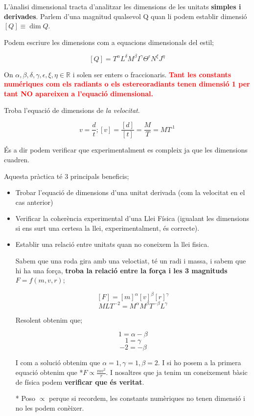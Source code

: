 \documentclass[12pt]{article}
\newcommand{\R}{\mathbb{R}}
\begin{document}
L'ànalisi dimensional tracta d'analitzar les dimensions de les unitats \textbf{simples i derivades}. Parlem d'una magnitud qualsevol Q quan li podem establir dimensió $[Q] \equiv \dim Q$.

Podem escriure les dimensions com a equacions dimensionals del estil;

\[[Q] = T^\alpha L^\delta M^\beta I^\gamma \Theta^\epsilon N^\xi J^\eta \]

On $\alpha,\beta,\delta,\gamma,\epsilon,\xi,\eta \in \R$ i solen ser enters o fraccionaris. \textcolor{red}{\textbf{Tant les constants numériques com els radiants o els estereoradiants tenen dimensió 1 per tant NO apareixen a l'equació dimensional.}}

\begin{examplebox}{}
    Troba l'equació de dimensions de \textit{la velocitat}.

    \[v = \frac{d}{t}; [v] = \frac{[d]}{[t]}= \frac{M}{T} = MT^{.1}\]

    És a dir podem verificar que experimentalment es compleix ja que les dimensions cuadren.

\end{examplebox}

Aquesta pràctica té 3 principals beneficis;

\begin{itemize}
    \item Trobar l'equació de dimensions d'una unitat derivada (com la velocitat en el cas anterior)
    \item Verificar la coherència experimental d'una Llei Física (igualant les dimensions si ens surt una certesa la llei, experimentalment, és correcte).
    \item Establir una relació entre unitats quan no coneixem la llei fisica.
    \begin{examplebox}{}
        Sabem que una roda gira amb una veloctiat, té un radi i massa, i sabem que hi ha una força, \textbf{troba la relació entre la força i les 3 magnituds} $F = f(m,v,r)$;
        
        \[[F] = [m]^\alpha[v]^\beta[r]^\gamma\]
        \[MLT^{-2} = M^\alpha M^\beta T^{-\beta} L^{\gamma}\]


    Resolent obtenim que;

    \[1 = \alpha -\beta\]
    \[1 = \gamma\]
    \[-2 =-\beta\]

    I com a solució obtenim que $\alpha = 1, \gamma = 1, \beta = 2$. I si ho posem a la primera equació obtenim que *$F \propto \frac{mv^2}{r}$. I nosaltres que ja tenim un coneixement bàsic de física podem \textbf{verificar que és veritat}.

    * Poso $\propto$ perque si recordem, les constants numèriques no tenen dimensió i no les podem conèixer.
    \end{examplebox}
\end{itemize}
\end{document}
